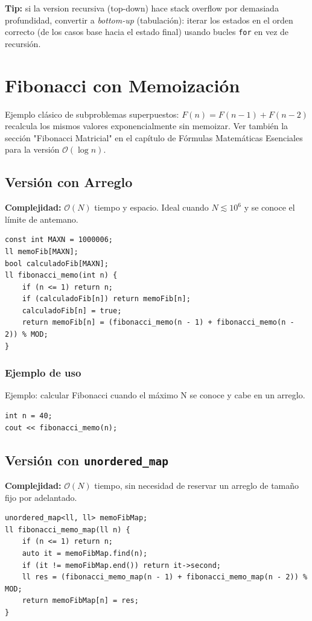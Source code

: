 \documentclass[10pt,twocolumn,letterpaper]{report}
\begin{document}
\textbf{Tip:} si la version recursiva (top-down) hace stack overflow por demasiada profundidad, convertir a \textit{bottom-up} (tabulación): iterar los estados en el orden correcto (de los casos base hacia el estado final) usando bucles \texttt{for} en vez de recursión.

\section{Fibonacci con Memoización}
Ejemplo clásico de subproblemas superpuestos: $F(n) = F(n-1) + F(n-2)$ recalcula los mismos valores exponencialmente sin memoizar. Ver también la sección "Fibonacci Matricial" en el capítulo de Fórmulas Matemáticas Esenciales para la versión $\mathcal{O}(\log n)$.

\subsection{Versión con Arreglo}
\textbf{Complejidad:} $\mathcal{O}(N)$ tiempo y espacio. Ideal cuando $N \lesssim 10^6$ y se conoce el límite de antemano.
\begin{lstlisting}
const int MAXN = 1000006;
ll memoFib[MAXN];
bool calculadoFib[MAXN];
ll fibonacci_memo(int n) {
    if (n <= 1) return n;
    if (calculadoFib[n]) return memoFib[n];
    calculadoFib[n] = true;
    return memoFib[n] = (fibonacci_memo(n - 1) + fibonacci_memo(n - 2)) % MOD;
}
\end{lstlisting}
\subsubsection*{Ejemplo de uso}
Ejemplo: calcular Fibonacci cuando el máximo N se conoce y cabe en un arreglo.
\begin{lstlisting}
int n = 40;
cout << fibonacci_memo(n);
\end{lstlisting}


\subsection{Versión con \texttt{unordered\_map}}
\textbf{Complejidad:} $\mathcal{O}(N)$ tiempo, sin necesidad de reservar un arreglo de tamaño fijo por adelantado.
\begin{lstlisting}
unordered_map<ll, ll> memoFibMap;
ll fibonacci_memo_map(ll n) {
    if (n <= 1) return n;
    auto it = memoFibMap.find(n);
    if (it != memoFibMap.end()) return it->second;
    ll res = (fibonacci_memo_map(n - 1) + fibonacci_memo_map(n - 2)) % MOD;
    return memoFibMap[n] = res;
}
\end{lstlisting}
\end{document}

